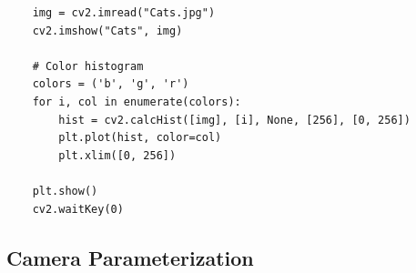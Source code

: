   \begin{lstlisting}
    img = cv2.imread("Cats.jpg")
    cv2.imshow("Cats", img) 

    # Color histogram 
    colors = ('b', 'g', 'r') 
    for i, col in enumerate(colors): 
        hist = cv2.calcHist([img], [i], None, [256], [0, 256]) 
        plt.plot(hist, color=col) 
        plt.xlim([0, 256]) 
        
    plt.show() 
    cv2.waitKey(0) 
  \end{lstlisting}

\subsection{Camera Parameterization} 

